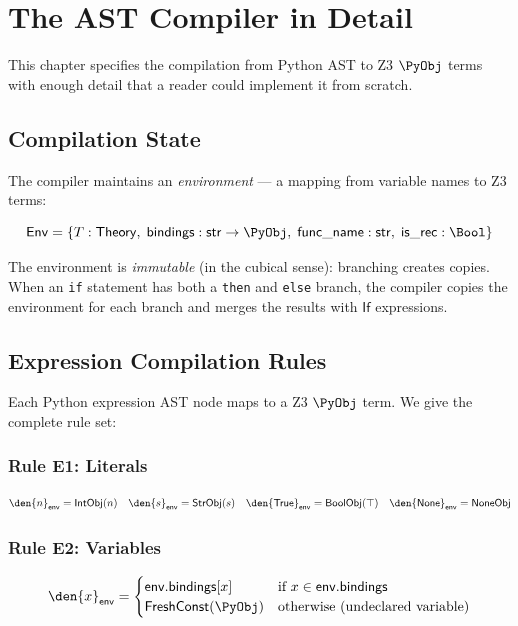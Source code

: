 
\chapter{The AST Compiler in Detail}
\label{ch:compiler-detail}

This chapter specifies the compilation from Python AST to Z3 $\PyObj$
terms with enough detail that a reader could implement it from scratch.

\section{Compilation State}

The compiler maintains an \emph{environment} --- a mapping from
variable names to Z3 terms:

\begin{definition}
\[
  \mathsf{Env} = \{T : \mathsf{Theory},\;
    \mathsf{bindings} : \mathsf{str} \to \PyObj,\;
    \mathsf{func\_name} : \mathsf{str},\;
    \mathsf{is\_rec} : \Bool\}
\]
\end{definition}

The environment is \emph{immutable} (in the cubical sense): branching
creates copies.  When an \texttt{if} statement has both a \texttt{then}
and \texttt{else} branch, the compiler copies the environment for each
branch and merges the results with $\mathsf{If}$ expressions.

\section{Expression Compilation Rules}

Each Python expression AST node maps to a Z3 $\PyObj$ term.  We give
the complete rule set:

\subsection{Rule E1: Literals}
\[
  \den{n}_\mathsf{env} = \mathsf{IntObj}(n) \quad
  \den{s}_\mathsf{env} = \mathsf{StrObj}(s) \quad
  \den{\mathsf{True}}_\mathsf{env} = \mathsf{BoolObj}(\top) \quad
  \den{\mathsf{None}}_\mathsf{env} = \mathsf{NoneObj}
\]

\subsection{Rule E2: Variables}
\[
  \den{x}_\mathsf{env} = \begin{cases}
    \mathsf{env.bindings}[x] & \text{if $x \in \mathsf{env.bindings}$} \\
    \mathsf{FreshConst}(\PyObj) & \text{otherwise (undeclared variable)}
  \end{cases}
\]

